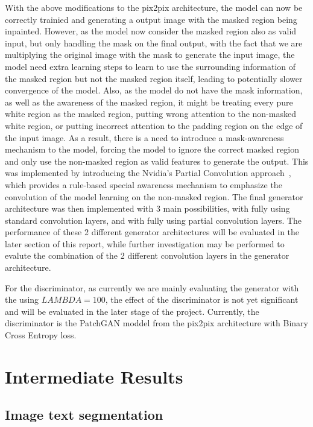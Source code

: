 \documentclass[10pt,twocolumn,letterpaper]{article}
\begin{document}
With the above modifications to the pix2pix architecture, the model can now be correctly trainied and generating a output image with the masked region being inpainted. However, as the model now 
consider the masked region also as valid input, but only handling the mask on the final output, with the fact that we are multiplying the original image with the mask to generate the input image, 
the model need extra learning steps to learn to use the surrounding information of the masked region but not the masked region itself, leading to potentially slower convergence of the model. Also,
as the model do not have the mask information, as well as the awareness of the masked region, it might be treating every pure white region as the masked region, putting wrong attention to the 
non-masked white region, or putting incorrect attention to the padding region on the edge of the input image. As a result, there is a need to introduce a mask-awareness mechanism to the 
model, forcing the model to ignore the correct masked region and only use the non-masked region as valid features to generate the output. This was implemented by introducing the Nvidia's 
Partial Convolution approach~\cite{Liu2018}, which provides a rule-based special awareness mechanism to emphasize the convolution of the model learning on the non-masked region. The final 
generator architecture was then implemented with 3 main possibilities, with fully using standard convolution layers, and with fully using partial convolution layers. The performance of these 2 
different generator architectures will be evaluated in the later section of this report, while further investigation may be performed to evalute the combination of the 2 different convolution 
layers in the generator architecture.

For the discriminator, as currently we are mainly evaluating the generator with the using $LAMBDA = 100$, the effect of the discriminator is not yet significant and will be evaluated in the later
stage of the project. Currently, the discriminator is the PatchGAN moddel from the pix2pix architecture with Binary Cross Entropy loss. 

\section{Intermediate Results}

\subsection{Image text segmentation}
\end{document}
